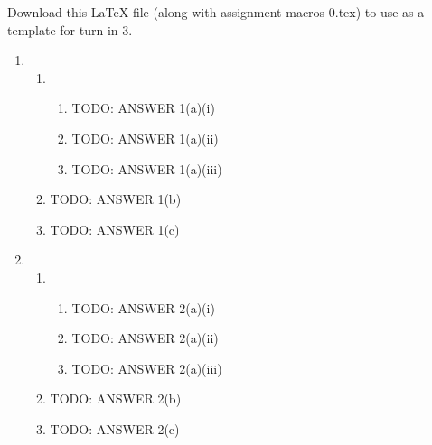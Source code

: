 \documentclass[11pt]{article}
\begin{document}
Download this LaTeX file (along with \textsf{assignment-macros-0.tex}) to use as a template for turn-in 3.


\begin{enumerate}


  \item %

  \begin{enumerate}
  \item %

    \begin{enumerate}
    \item

      TODO: ANSWER 1(a)(i) 

    \item

      TODO: ANSWER 1(a)(ii) 

    \item

      TODO: ANSWER 1(a)(iii)

    \end{enumerate}
    
  \item 

    TODO: ANSWER 1(b) 

  \item 

    TODO: ANSWER 1(c)

  \end{enumerate}

  \item %

  \begin{enumerate}
  \item %

    \begin{enumerate}
    \item

      TODO: ANSWER 2(a)(i) 

    \item

      TODO: ANSWER 2(a)(ii) 

    \item

      TODO: ANSWER 2(a)(iii)

    \end{enumerate}
    
  \item

    TODO: ANSWER 2(b) 

  \item 
    TODO: ANSWER 2(c) 

  \end{enumerate}

\end{enumerate}
\end{document}
